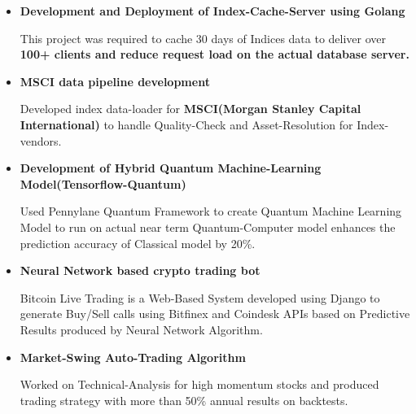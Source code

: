 \documentclass[11pt,a4paper,sans]{moderncv}        %
\begin{document}
{\vspace{5pt}

\begin{itemize}

\item{\textbf{Development and Deployment of Index-Cache-Server using Golang} \textit{}

\vspace{3pt}

\small{This project was required to cache 30 days of Indices data to deliver over \textbf{100+ clients and reduce request load on the actual database server.}}}

\item{\textbf{MSCI data pipeline development} \textit{}

\vspace{3pt}

\small{Developed index data-loader for \textbf{MSCI(Morgan Stanley Capital International)} to handle Quality-Check and Asset-Resolution for Index-vendors.}}

\vspace{6pt}

\item{\textbf{Development of Hybrid Quantum Machine-Learning Model(Tensorflow-Quantum)} \textit{}

\vspace{3pt}

\small{Used Pennylane Quantum Framework to create Quantum Machine Learning Model to run on actual near term Quantum-Computer model enhances the prediction accuracy of Classical model by 20\%.}}

\vspace{6pt}
\item{\textbf{Neural Network based crypto trading bot}

\vspace{3pt}

\small{Bitcoin Live Trading is a Web-Based System developed using Django to generate Buy/Sell
calls using Bitfinex and Coindesk APIs based on Predictive Results produced by Neural Network Algorithm.}}

\vspace{6pt}

\item {\textbf{Market-Swing Auto-Trading Algorithm}

\small{Worked on Technical-Analysis for high momentum stocks and produced trading strategy with more than 50\% annual results on backtests.}}


\end{itemize}}
\end{document}

